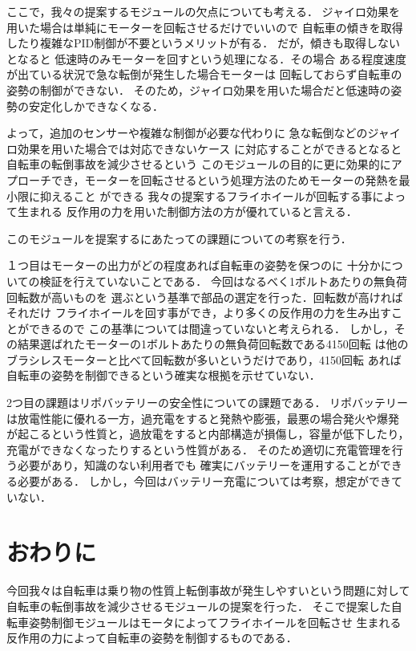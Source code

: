 \documentclass[uplatex,dvipdfmx]{jsarticle}
\begin{document}
ここで，我々の提案するモジュールの欠点についても考える．
ジャイロ効果を用いた場合は単純にモーターを回転させるだけでいいので
自転車の傾きを取得したり複雑なPID制御が不要というメリットが有る．
だが，傾きも取得しないとなると
低速時のみモーターを回すという処理になる．その場合
ある程度速度が出ている状況で急な転倒が発生した場合モーターは
回転しておらず自転車の姿勢の制御ができない．
そのため，ジャイロ効果を用いた場合だと低速時の姿勢の安定化しかできなくなる．

よって，追加のセンサーや複雑な制御が必要な代わりに
急な転倒などのジャイロ効果を用いた場合では対応できないケース
に対応することができるとなると自転車の転倒事故を減少させるという
このモジュールの目的に更に効果的にアプローチでき，モーターを回転させるという処理方法のためモーターの発熱を最小限に抑えること
ができる
我々の提案するフライホイールが回転する事によって生まれる
反作用の力を用いた制御方法の方が優れていると言える．




このモジュールを提案するにあたっての課題についての考察を行う．

１つ目はモーターの出力がどの程度あれば自転車の姿勢を保つのに
十分かについての検証を行えていないことである．
今回はなるべく1ボルトあたりの無負荷回転数が高いものを
選ぶという基準で部品の選定を行った．回転数が高ければそれだけ
フライホイールを回す事ができ，より多くの反作用の力を生み出すことができるので
この基準については間違っていないと考えられる．
しかし，その結果選ばれたモーターの1ボルトあたりの無負荷回転数である4150回転
は他のブラシレスモーターと比べて回転数が多いというだけであり，4150回転
あれば自転車の姿勢を制御できるという確実な根拠を示せていない．

2つ目の課題はリポバッテリーの安全性についての課題である．
リポバッテリーは放電性能に優れる一方，過充電をすると発熱や膨張，最悪の場合発火や爆発
が起こるという性質と，過放電をすると内部構造が損傷し，容量が低下したり，
充電ができなくなったりするという性質がある．
そのため適切に充電管理を行う必要があり，知識のない利用者でも
確実にバッテリーを運用することができる必要がある．
しかし，今回はバッテリー充電については考察，想定ができていない．

\section{おわりに}

今回我々は自転車は乗り物の性質上転倒事故が発生しやすいという問題に対して
自転車の転倒事故を減少させるモジュールの提案を行った．
そこで提案した自転車姿勢制御モジュールはモータによってフライホイールを回転させ
生まれる反作用の力によって自転車の姿勢を制御するものである．
\end{document}
